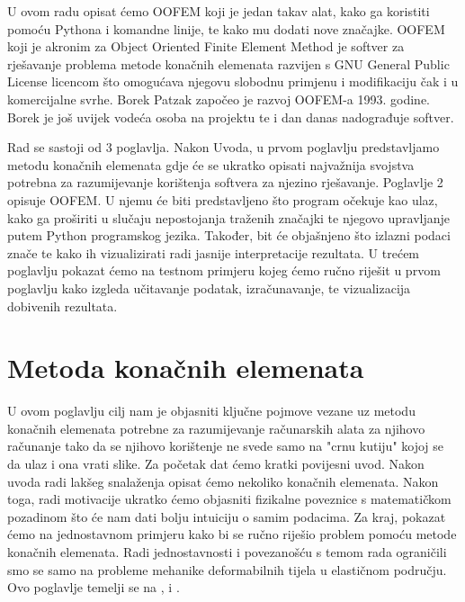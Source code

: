 \documentclass[a4paper,twoside,12pt]{memoir} %
\begin{document}
\begin{intro}
U ovom radu opisat ćemo OOFEM koji je jedan takav alat, kako ga koristiti pomoću Pythona i komandne linije, te kako mu dodati nove značajke. OOFEM koji je akronim za Object Oriented Finite Element Method je softver za rješavanje problema metode konačnih elemenata razvijen s GNU General Public License licencom što omogućava njegovu slobodnu primjenu i modifikaciju čak i u komercijalne svrhe. Borek Patzak započeo je razvoj OOFEM-a 1993. godine. Borek je još uvijek vodeća osoba na projektu te i dan danas nadograđuje softver. \par

Rad se sastoji od 3 poglavlja. Nakon Uvoda, u prvom poglavlju predstavljamo metodu konačnih elemenata gdje će se ukratko opisati najvažnija svojstva potrebna za razumijevanje korištenja softvera za njezino rješavanje. Poglavlje 2 opisuje OOFEM. U njemu će biti predstavljeno što program očekuje kao ulaz, kako ga proširiti u slučaju nepostojanja traženih značajki te njegovo upravljanje putem Python programskog jezika. Također, bit će objašnjeno što izlazni podaci znače te kako ih vizualizirati radi jasnije interpretacije rezultata. U trećem poglavlju pokazat ćemo na testnom primjeru kojeg ćemo ručno riješit u prvom poglavlju kako izgleda učitavanje podatak, izračunavanje, te vizualizacija dobivenih rezultata.

\end{intro}


\chapter{Metoda konačnih elemenata}	
U ovom poglavlju cilj nam je objasniti ključne pojmove vezane uz metodu konačnih elemenata potrebne za razumijevanje računarskih alata za njihovo računanje tako da se njihovo korištenje ne svede samo na "crnu kutiju" kojoj se da ulaz i ona vrati slike. Za početak dat ćemo kratki povijesni uvod. Nakon uvoda radi lakšeg snalaženja opisat ćemo nekoliko konačnih elemenata. Nakon toga, radi motivacije ukratko ćemo objasniti fizikalne poveznice s matematičkom pozadinom što će nam dati bolju intuiciju o samim podacima. Za kraj, pokazat ćemo na jednostavnom primjeru kako bi se ručno riješio problem pomoću metode konačnih elemenata. Radi jednostavnosti i povezanošću s temom rada ograničili smo se samo na probleme mehanike deformabilnih tijela u elastičnom području. Ovo poglavlje temelji se na \cite{jurica_soric}, \cite{coursera} i \cite{wiki_fem_18}.
\end{document}
